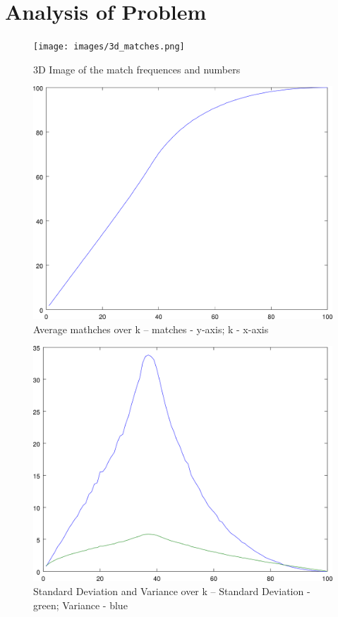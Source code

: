 \documentclass{article}
\begin{document}
   \section{Analysis of Problem}
      \begin{figure}[H]
         \texttt{[image: images/3d\_matches.png]}
         \caption{3D Image of the match frequences and numbers}
      \end{figure}
      \begin{figure}[H]
         \includegraphics[width=\textheight/2]{images/mean.png}
         \caption{Average mathches over k --
                  matches - y-axis; k - x-axis}
      \end{figure}
      \begin{figure}[H]
         \includegraphics[width=\textheight/2]{images/dev_var.png}
         \caption{Standard Deviation and Variance over k --
                  Standard Deviation - green; Variance - blue}
      \end{figure}
\end{document}
